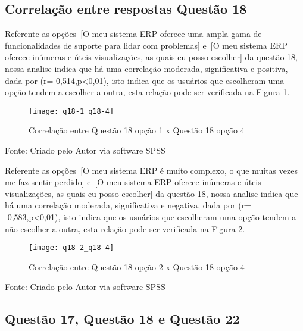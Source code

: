 \subsection{Correlação entre respostas Questão 18}

Referente as opções [O meu sistema ERP oferece uma ampla gama de funcionalidades de suporte para lidar com problemas] e [O meu sistema ERP oferece inúmeras e úteis visualizações, as quais eu posso escolher] da questão 18, nossa analise indica que há uma correlação moderada, significativa e positiva, dada por (r= 0,514,p<0,01), isto indica que os usuários que escolheram uma opção tendem a escolher a outra, esta relação pode ser verificada na Figura  \ref{fig:figura-q181_q184}.\newline

\begin{figure}[H]
	\centering	
	\caption{Correlação entre Questão 18 opção 1 x Questão 18 opção 4}
	\texttt{[image: q18-1\_q18-4]}
	\label{fig:figura-q181_q184}
\end{figure}
\vspace{-0.8 cm} \hspace{0.45 cm} Fonte: Criado pelo Autor via software SPSS\newline

Referente as opções [O meu sistema ERP é muito complexo, o que muitas vezes me faz sentir perdido] e [O meu sistema ERP oferece inúmeras e úteis visualizações, as quais eu posso escolher] da questão 18, nossa analise indica que há uma correlação moderada, significativa e negativa, dada por (r= -0,583,p<0,01), isto indica que os usuários que escolheram uma opção tendem a não escolher a outra, esta relação pode ser verificada na Figura \ref{fig:figura-q182_q184}.\newline

\begin{figure}[H]
	\centering	
	\caption{Correlação entre Questão 18 opção 2 x Questão 18 opção 4}
	\texttt{[image: q18-2\_q18-4]}
	\label{fig:figura-q182_q184}
\end{figure}
\vspace{-0.8 cm} \hspace{0.45 cm} Fonte: Criado pelo Autor via software SPSS\newline

\subsection{Questão 17, Questão 18 e Questão 22}

